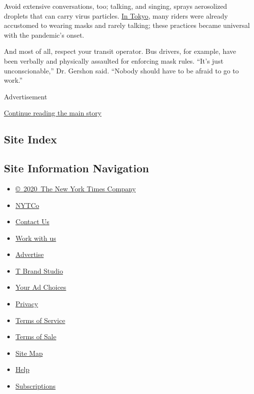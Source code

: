 Avoid extensive conversations, too; talking, and singing, sprays
aerosolized droplets that can carry virus particles.
\href{https://www.sciencemag.org/news/2020/05/japan-ends-its-covid-19-state-emergency}{In
Tokyo}, many riders were already accustomed to wearing masks and rarely
talking; these practices became universal with the pandemic's onset.

And most of all, respect your transit operator. Bus drivers, for
example, have been verbally and physically assaulted for enforcing mask
rules. ``It's just unconscionable,'' Dr. Gershon said. ``Nobody should
have to be afraid to go to work.''

Advertisement

\protect\hyperlink{after-bottom}{Continue reading the main story}

\hypertarget{site-index}{%
\subsection{Site Index}\label{site-index}}

\hypertarget{site-information-navigation}{%
\subsection{Site Information
Navigation}\label{site-information-navigation}}

\begin{itemize}
\tightlist
\item
  \href{https://help.nytimes.com/hc/en-us/articles/115014792127-Copyright-notice}{©~2020~The
  New York Times Company}
\end{itemize}

\begin{itemize}
\tightlist
\item
  \href{https://www.nytco.com/}{NYTCo}
\item
  \href{https://help.nytimes.com/hc/en-us/articles/115015385887-Contact-Us}{Contact
  Us}
\item
  \href{https://www.nytco.com/careers/}{Work with us}
\item
  \href{https://nytmediakit.com/}{Advertise}
\item
  \href{http://www.tbrandstudio.com/}{T Brand Studio}
\item
  \href{https://www.nytimes.com/privacy/cookie-policy\#how-do-i-manage-trackers}{Your
  Ad Choices}
\item
  \href{https://www.nytimes.com/privacy}{Privacy}
\item
  \href{https://help.nytimes.com/hc/en-us/articles/115014893428-Terms-of-service}{Terms
  of Service}
\item
  \href{https://help.nytimes.com/hc/en-us/articles/115014893968-Terms-of-sale}{Terms
  of Sale}
\item
  \href{https://spiderbites.nytimes.com}{Site Map}
\item
  \href{https://help.nytimes.com/hc/en-us}{Help}
\item
  \href{https://www.nytimes.com/subscription?campaignId=37WXW}{Subscriptions}
\end{itemize}
